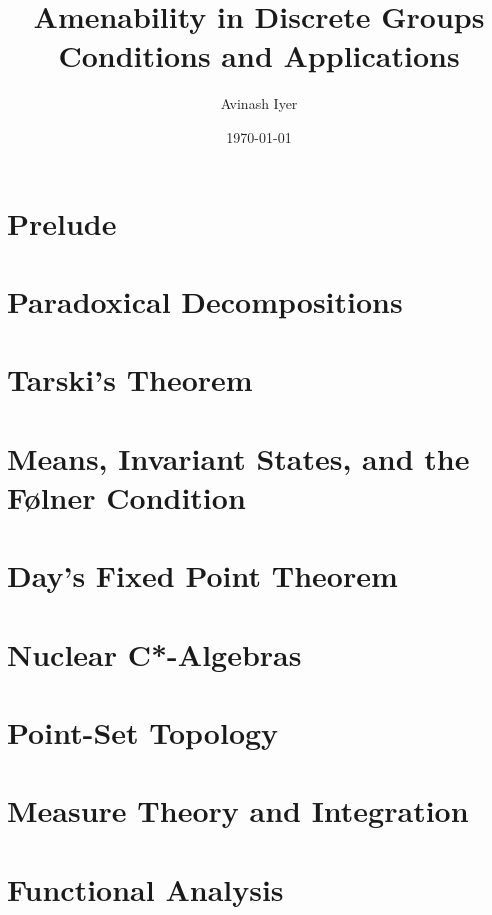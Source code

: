 \documentclass[10pt]{package2}
\title{Amenability in Discrete Groups\\ {\large Conditions and Applications}}
\author{Avinash Iyer}
\date{\today}
\newcommand{\1}{\mathds{1}}
\begin{document}
\maketitle
\RaggedRight
\tableofcontents
\chapter{Prelude}
\chapter{Paradoxical Decompositions}

\chapter{Tarski's Theorem}

\chapter{Means, Invariant States, and the Følner Condition}

\chapter{Day's Fixed Point Theorem}
\chapter{Nuclear C*-Algebras}
\appendix
\chapter{Point-Set Topology}

\chapter{Measure Theory and Integration}

\chapter{Functional Analysis}
\nocite{*}
\printbibliography
\end{document}
